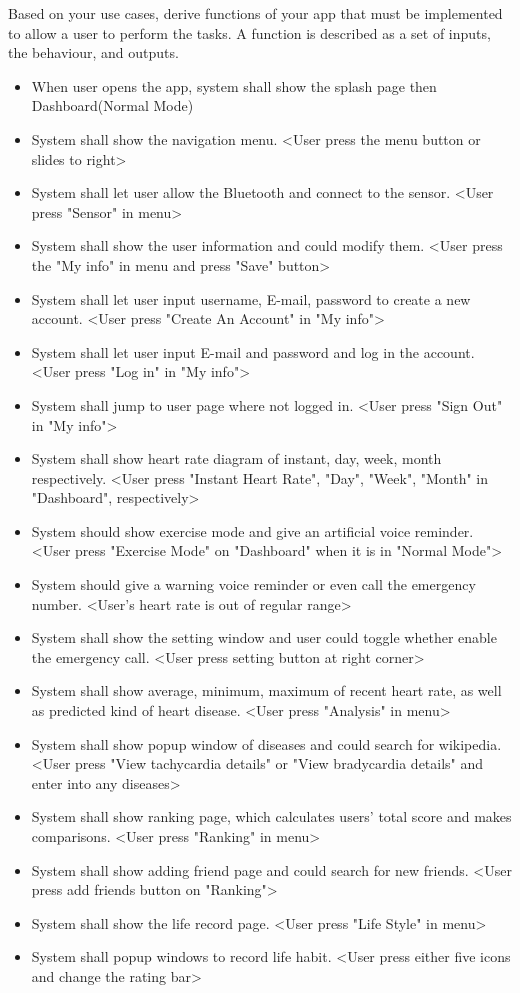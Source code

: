 Based on your use cases, derive functions of your app that must be implemented to allow a user to perform the tasks. A function is described as a set of inputs, the behaviour, and outputs. 

\begin{itemize}

\item When user opens the app, system shall show the splash page then Dashboard(Normal Mode)
\item System shall show the navigation menu. <User press the menu button or slides to right> 
\item System shall let user allow the Bluetooth and connect to the sensor. <User press "Sensor" in menu> 
\item System shall show the user information and could modify them. <User press the "My info" in menu and press "Save" button> 
\item System shall let user input username, E-mail, password to create a new account. <User press "Create An Account" in "My info"> 
\item System shall let user input E-mail and password and log in the account. <User press "Log in" in "My info"> 
\item System shall jump to user page where not logged in. <User press "Sign Out" in "My info"> 
\item System shall show heart rate diagram of instant, day, week, month respectively. <User press "Instant Heart Rate", "Day", "Week", "Month" in "Dashboard", respectively> 
\item System should show exercise mode and give an artificial voice reminder. <User press "Exercise Mode" on "Dashboard" when it is in "Normal Mode"> 
\item System should give a warning voice reminder or even call the emergency number. <User's heart rate is out of regular range> 
\item System shall show the setting window and user could toggle whether enable the emergency call. <User press setting button at right corner> 
\item System shall show average, minimum, maximum of recent heart rate, as well as predicted kind of heart disease. <User press "Analysis" in menu> 
\item System shall show popup window of diseases and could search for wikipedia. <User press "View tachycardia details" or "View bradycardia details" and enter into any diseases> 
\item System shall show ranking page, which calculates users' total score and makes comparisons. <User press "Ranking" in menu> 
\item System shall show adding friend page and could search for new friends. <User press add friends button on "Ranking"> 
\item System shall show the life record page. <User press "Life Style" in menu> 
\item System shall popup windows to record life habit. <User press either five icons and change the rating bar> 

\end{itemize} 
